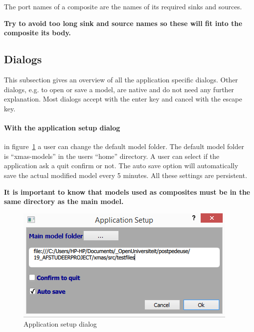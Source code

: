 The port names of a composite are the names of its required sinks and sources.
\begin{tcolorbox}[colback=white]
\textbf{
Try to avoid too long sink and source names so these will fit into the composite its body.
}
\end{tcolorbox}




\subsection{Dialogs}
This subsection gives an overview of all the application specific dialogs. Other
dialogs, e.g. to open or save a model, are native and do not need any further
explanation.
Most dialogs accept with the enter key and cancel with the escape key.

\paragraph{With the application setup dialog} in figure~\ref{fig:app-setup} a
user can change the default model folder. The default model folder is
``xmas-models'' in the users ``home'' directory. A user can select if the
application ask a quit confirm or not. The auto save option will automatically
save the actual modified model every 5 minutes. All these settings are
persistent.\\

\begin{tcolorbox}[colback=white]
\textbf{
It is important to know that models used as composites must be in the same
directory as the main model.
}
\end{tcolorbox}
   
\begin{figure}[t]
\begin{center}	
	\includegraphics[width=.70\linewidth]{pictures/app-setup}
	\caption{Application setup dialog}
	\label{fig:app-setup}
\end{center}
\end{figure}

